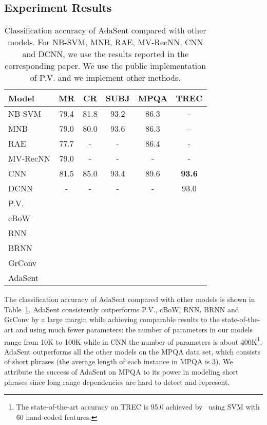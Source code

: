 \documentclass{article}
\theoremstyle{definition}
\begin{document}
\subsection{Experiment Results}
\begin{table}[htb]
\centering
\begin{tabular}{l||c|c|c|c|c}\hline
\textbf{Model} & MR & CR & SUBJ & MPQA & TREC \\\hline
NB-SVM & 79.4 & 81.8 & 93.2 & 86.3 & - \\
MNB & 79.0 & 80.0 & 93.6 & 86.3 & - \\
RAE &  77.7 & - & - & 86.4 & - \\
MV-RecNN & 79.0 & - & - & - & - \\
CNN & 81.5 & 85.0 & 93.4 & 89.6 & \textbf{93.6} \\
DCNN & - & - & - & - & 93.0 \\\hline
P.V. &  &  &  &  &  \\\hline
cBoW &  &  &  &  &  \\
RNN &  &  &  &  &  \\
BRNN &  &  &  &  &  \\
GrConv &  &  &  &  &  \\\hline
AdaSent &  &  &  &  & \\\hline
\end{tabular}
\caption{Classification accuracy of AdaSent compared with other models. For NB-SVM, MNB, RAE, MV-RecNN, CNN and DCNN, we use the results reported in the corresponding paper. We use the public implementation of P.V. and we implement other methods.}
\label{table:result}
\end{table}

The classification accuracy of AdaSent compared with other models is shown in Table~\ref{table:result}. AdaSent consistently outperforms P.V., cBoW, RNN, BRNN and GrConv by a large margin while achieving comparable results to the state-of-the-art and using much fewer parameters: the number of parameters in our models range from 10K to 100K while in CNN the number of parameters is about 400K\footnote{The state-of-the-art accuracy on TREC is 95.0 achieved by~\cite{silva2011symbolic} using SVM with 60 hand-coded features.}. AdaSent outperforms all the other models on the MPQA data set, which consists of short phrases (the average length of each instance in MPQA is 3). We attribute the success of AdaSent on MPQA to its power in modeling short phrases since long range dependencies are hard to detect and represent.
\end{document}
